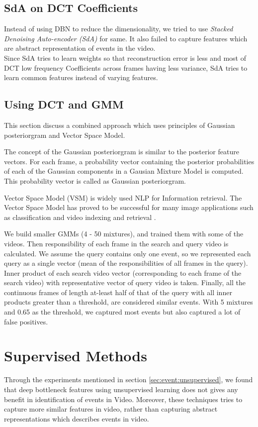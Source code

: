 \subsection{SdA on DCT Coefficients}
Instead of using DBN to reduce the dimensionality, we tried to use \textit{Stacked Denoising Auto-encoder (SdA)} for same. It also failed to capture features which are abstract representation of events in the video.\\
Since SdA tries to learn weights so that reconstruction error is less and most of DCT low frequency Coefficients across frames having less variance, SdA tries to learn common features instead of varying features.\\

\subsection{Using DCT and GMM}
\label{sec:event:dct_gmm}
This section discuss a combined approach which uses principles of Gaussian posteriorgram and Vector Space Model.

The concept of the Gaussian posteriorgram is similar to the posterior feature vectors\citep{zhang2010towards}. For each frame, a probability vector containing the posterior probabilities of each of the Gaussian components in a Gausian Mixture Model is computed. This probability vector is called as  Gaussian posteriorgram. 

Vector Space Model (VSM) is widely used NLP for Information retrieval. The Vector Space Model has proved to be successful for many image applications such as classification and video indexing and retrieval \citep{galmar2007analysis}. 

We build smaller GMMs (4 - 50 mixtures), and trained them with some of the videos. Then responsibility of each frame in the search and query video is calculated. We assume the query contains only one event, so we represented each query as a single vector (mean of the responsibilities of all frames in the query). Inner product of each search video vector (corresponding to each frame of the search video) with representative vector of query video is taken. Finally, all the continuous frames of length at-least half of that of the query with all inner products greater than a threshold, are considered similar events. With 5 mixtures and 0.65 as the threshold, we captured most events but also captured a lot of false positives.

\section{Supervised Methods}
\label{sec:event:supervised}
Through the experiments mentioned in section  \ref{sec:event:unsupervised}, we found that deep bottleneck features using unsupervised learning does not gives any benefit in identification of events in Video. Moreover, these techniques tries to capture more similar features in video, rather than capturing abstract representations which describes events in video.

